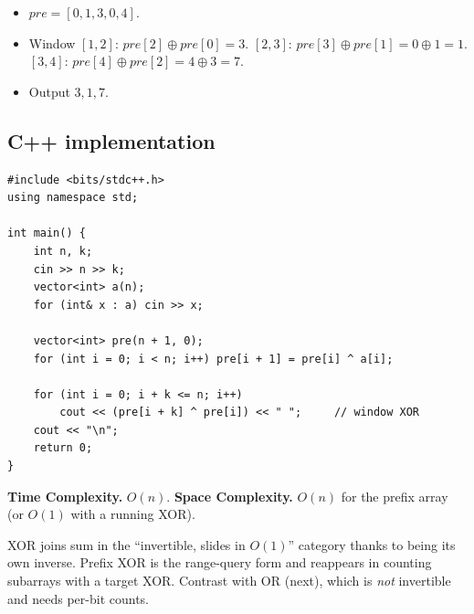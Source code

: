 
\begin{itemize}
  \item $\textit{pre}=[0,1,3,0,4]$.
  \item Window $[1,2]$: $\textit{pre}[2]\oplus\textit{pre}[0]=3$.
        $[2,3]$: $\textit{pre}[3]\oplus\textit{pre}[1]=0\oplus1=1$.
        $[3,4]$: $\textit{pre}[4]\oplus\textit{pre}[2]=4\oplus3=7$.
  \item Output $3,1,7$.
\end{itemize}

\subsection*{C++ implementation}

\begin{lstlisting}
#include <bits/stdc++.h>
using namespace std;

int main() {
    int n, k;
    cin >> n >> k;
    vector<int> a(n);
    for (int& x : a) cin >> x;

    vector<int> pre(n + 1, 0);
    for (int i = 0; i < n; i++) pre[i + 1] = pre[i] ^ a[i];

    for (int i = 0; i + k <= n; i++)
        cout << (pre[i + k] ^ pre[i]) << " ";     // window XOR
    cout << "\n";
    return 0;
}
\end{lstlisting}

\begin{complexitybox}
\textbf{Time Complexity.} $O(n)$. \textbf{Space Complexity.} $O(n)$ for the
prefix array (or $O(1)$ with a running XOR).
\end{complexitybox}

\begin{takeawaybox}
XOR joins sum in the ``invertible, slides in $O(1)$'' category thanks to
being its own inverse. Prefix XOR is the range-query form and reappears in
counting subarrays with a target XOR. Contrast with OR (next), which is
\emph{not} invertible and needs per-bit counts.
\end{takeawaybox}

